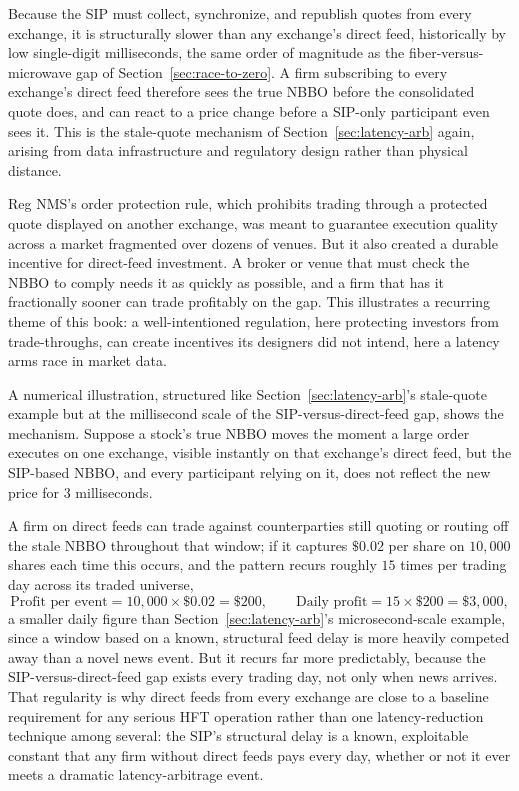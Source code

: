 \documentclass[../ai_in_finance]{subfiles}
\begin{document}
Because the SIP must collect, synchronize, and republish quotes from every exchange, it is structurally slower than any exchange's direct feed, historically by low single-digit milliseconds, the same order of magnitude as the fiber-versus-microwave gap of Section~\ref{sec:race-to-zero}. A firm subscribing to every exchange's direct feed therefore sees the true NBBO before the consolidated quote does, and can react to a price change before a SIP-only participant even sees it. This is the stale-quote mechanism of Section~\ref{sec:latency-arb} again, arising from data infrastructure and regulatory design rather than physical distance.

Reg NMS's order protection rule, which prohibits trading through a protected quote displayed on another exchange, was meant to guarantee execution quality across a market fragmented over dozens of venues. But it also created a durable incentive for direct-feed investment. A broker or venue that must check the NBBO to comply needs it as quickly as possible, and a firm that has it fractionally sooner can trade profitably on the gap. This illustrates a recurring theme of this book: a well-intentioned regulation, here protecting investors from trade-throughs, can create incentives its designers did not intend, here a latency arms race in market data.

A numerical illustration, structured like Section~\ref{sec:latency-arb}'s stale-quote example but at the millisecond scale of the SIP-versus-direct-feed gap, shows the mechanism. Suppose a stock's true NBBO moves the moment a large order executes on one exchange, visible instantly on that exchange's direct feed, but the SIP-based NBBO, and every participant relying on it, does not reflect the new price for $3$ milliseconds.

A firm on direct feeds can trade against counterparties still quoting or routing off the stale NBBO throughout that window; if it captures $\$0.02$ per share on $10{,}000$ shares each time this occurs, and the pattern recurs roughly $15$ times per trading day across its traded universe,
\begin{equation*}
\text{Profit per event} = 10{,}000 \times \$0.02 = \$200, \qquad \text{Daily profit} = 15 \times \$200 = \$3{,}000,
\end{equation*}
a smaller daily figure than Section~\ref{sec:latency-arb}'s microsecond-scale example, since a window based on a known, structural feed delay is more heavily competed away than a novel news event. But it recurs far more predictably, because the SIP-versus-direct-feed gap exists every trading day, not only when news arrives. That regularity is why direct feeds from every exchange are close to a baseline requirement for any serious HFT operation rather than one latency-reduction technique among several: the SIP's structural delay is a known, exploitable constant that any firm without direct feeds pays every day, whether or not it ever meets a dramatic latency-arbitrage event.
\end{document}
